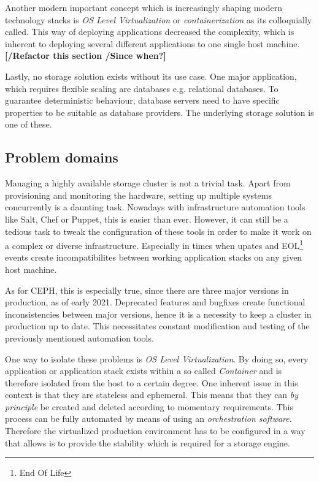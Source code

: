 \documentclass[titlepage, a4paper, 11pt]{scrartcl}
\begin{document}
        Another modern important concept which is increasingly shaping modern technology stacks is \textit{OS Level Virtualization} or
        \textit{containerization} as its colloquially called. This way of deploying applications decreased the complexity, which is
        inherent to deploying several different applications to one single host machine. \textbf{[/Refactor this section /Since when?]}

        Lastly, no storage solution exists without its use case. One major application, which requires flexible scaling are databases e.g. 
        relational databases. To guarantee deterministic behaviour, database servers need to have specific properties to be suitable
        as database providers. The underlying storage solution is one of these.

        \subsection{Problem domains}\label{introduction}
            
            Managing a highly available storage cluster is not a trivial task. Apart from provisioning and monitoring the hardware,
            setting up multiple systems concurrently is a daunting task. Nowadays with infrastructure automation tools like Salt, Chef or Puppet, 
            this is easier than ever. However, it can still be a tedious task to tweak the configuration of these tools
            in order to make it work on a complex or diverse infrastructure. Especially in times when upates and EOL\footnote{End Of Life} events
            create incompatibilites between working application stacks on any given host machine.

            As for CEPH, this is especially true, since there are three major versions in production\cite{cephreleases}, as of early 2021.
            Deprecated features and bugfixes create functional inconsistencies between major versions, hence it is a necessity to 
            keep a cluster in production up to date. This necessitates constant modification and testing of the previously mentioned automation tools.

            One way to isolate these problems is \textit{OS Level Virtualization}. By doing so, every application or application stack 
            exists within a so called \textit{Container} and is therefore isolated from the host to a certain degree. 
            One inherent issue in this context is that they are stateless and ephemeral. This means that they can 
            \textit{by principle} be created and deleted according to momentary requirements. This process can be fully automated
            by means of using an \textit{orchestration software}. Therefore the virtualized production environment has to be
            configured in a way that allows is to provide the stability which is required for a storage engine.
\end{document}

